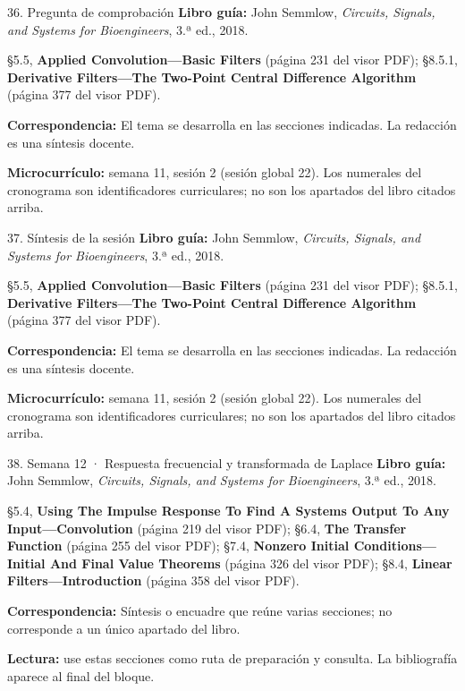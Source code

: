 \documentclass[
  10pt,
  ignorenonframetext,
  aspectratio=169,
  spanish,
]{beamer}
\begin{document}
\begin{frame}{36. Pregunta de comprobación}
\label{pregunta-de-comprobaciuxf3n-1}
\textbf{Libro guía:} John Semmlow, \emph{Circuits, Signals, and Systems
for Bioengineers}, 3.ª ed., 2018.

§5.5, \textbf{Applied Convolution---Basic Filters} (página 231 del visor
PDF); §8.5.1, \textbf{Derivative Filters---The Two-Point Central
Difference Algorithm} (página 377 del visor PDF).

\textbf{Correspondencia:} El tema se desarrolla en las secciones
indicadas. La redacción es una síntesis docente.

\textbf{Microcurrículo:} semana 11, sesión 2 (sesión global 22). Los
numerales del cronograma son identificadores curriculares; no son los
apartados del libro citados arriba.
\end{frame}

\begin{frame}{37. Síntesis de la sesión}
\label{suxedntesis-de-la-sesiuxf3n-1}
\textbf{Libro guía:} John Semmlow, \emph{Circuits, Signals, and Systems
for Bioengineers}, 3.ª ed., 2018.

§5.5, \textbf{Applied Convolution---Basic Filters} (página 231 del visor
PDF); §8.5.1, \textbf{Derivative Filters---The Two-Point Central
Difference Algorithm} (página 377 del visor PDF).

\textbf{Correspondencia:} El tema se desarrolla en las secciones
indicadas. La redacción es una síntesis docente.

\textbf{Microcurrículo:} semana 11, sesión 2 (sesión global 22). Los
numerales del cronograma son identificadores curriculares; no son los
apartados del libro citados arriba.
\end{frame}

\begin{frame}{38. Semana 12 · Respuesta frecuencial y transformada de
Laplace}
\label{semana-12-respuesta-frecuencial-y-transformada-de-laplace}
\textbf{Libro guía:} John Semmlow, \emph{Circuits, Signals, and Systems
for Bioengineers}, 3.ª ed., 2018.

§5.4, \textbf{Using The Impulse Response To Find A Systems Output To Any
Input---Convolution} (página 219 del visor PDF); §6.4, \textbf{The
Transfer Function} (página 255 del visor PDF); §7.4, \textbf{Nonzero
Initial Conditions---Initial And Final Value Theorems} (página 326 del
visor PDF); §8.4, \textbf{Linear Filters---Introduction} (página 358 del
visor PDF).

\textbf{Correspondencia:} Síntesis o encuadre que reúne varias
secciones; no corresponde a un único apartado del libro.

\textbf{Lectura:} use estas secciones como ruta de preparación y
consulta. La bibliografía aparece al final del bloque.
\end{frame}
\end{document}
